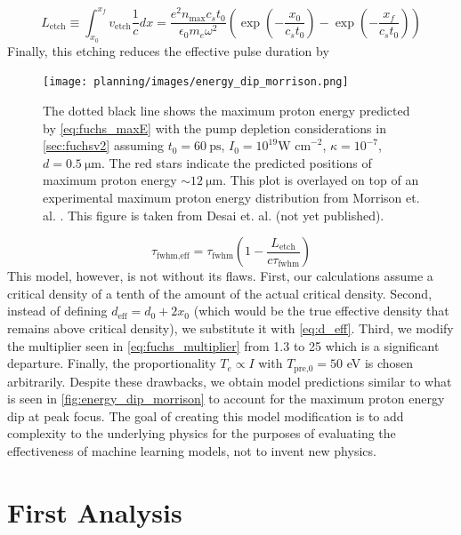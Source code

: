 \begin{equation}
	L_\text{etch} \equiv \int_{x_0}^{x_f} v_\text{etch} \frac{1}{c} dx = \frac{e^2 n_\text{max} c_s t_0}{\epsilon_0 m_e \omega^2} \left( \exp{\left(-\frac{x_0}{c_s t_0}\right)} - \exp{\left(-\frac{x_f}{c_s t_0}\right)} \right)
\end{equation}
Finally, this etching reduces the effective pulse duration by 

\begin{figure}
	\centering 
	\texttt{[image: planning/images/energy\_dip\_morrison.png]}
	\caption{The dotted black line shows the maximum proton energy predicted by \autoref{eq:fuchs_maxE} with the pump depletion considerations in \autoref{sec:fuchsv2} assuming $t_0 = \SI{60}{\pico \second}$, $I_0 = 10^{19} \text{W cm}^{-2}$, $\kappa=10^{-7}$, $d=\SI{0.5}{\micro \meter}$. The red stars indicate the predicted positions of maximum proton energy $\sim \SI{12}{\micro \meter}$. This plot is overlayed on top of an experimental maximum proton energy distribution from Morrison et. al. \cite{Morrison_2018_NJoP}. This figure is taken from Desai et. al. \cite{Desai_2025_APL} (not yet published).}
	\label{fig:energy_dip_morrison}
\end{figure}
\begin{equation}
	\tau_\text{fwhm,eff} = \tau_\text{fwhm} (1 - \frac{L_\text{etch}}{c \tau_\text{fwhm}}) \label{eq:tau_etch}
\end{equation}
This model, however, is not without its flaws. First, our calculations assume a critical density of a tenth of the amount of the actual critical density. Second, instead of defining $d_\text{eff} = d_0 + 2 x_0$ (which would be the true effective density that remains above critical density), we substitute it with \autoref{eq:d_eff}. Third, we modify the multiplier seen in \autoref{eq:fuchs_multiplier} from 1.3 to 25 which is a significant departure. Finally, the proportionality $T_e \propto I$ with $T_\text{pre,0} = 50$ eV is chosen arbitrarily. Despite these drawbacks, we obtain model predictions similar to what is seen in \autoref{fig:energy_dip_morrison} to account for the maximum proton energy dip at peak focus. The goal of creating this model modification is to add complexity to the underlying physics for the purposes of evaluating the effectiveness of machine learning models, not to invent new physics. 

\section{First Analysis} \label{sec:first_analysis}

